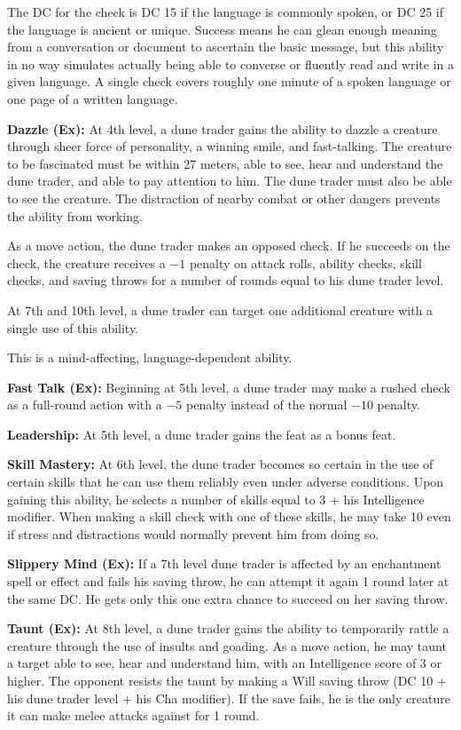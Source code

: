 {The DC for the check is DC 15 if the language is commonly spoken, or DC 25 if the language is ancient or unique. Success means he can glean enough meaning from a conversation or document to ascertain the basic message, but this ability in no way simulates actually being able to converse or fluently read and write in a given language. A single check covers roughly one minute of a spoken language or one page of a written language.

\textbf{Dazzle (Ex):} At 4th level, a dune trader gains the ability to dazzle a creature through sheer force of personality, a winning smile, and fast-talking. The creature to be fascinated must be within 27 meters, able to see, hear and understand the dune trader, and able to pay attention to him. The dune trader must also be able to see the creature. The distraction of nearby combat or other dangers prevents the ability from working.

As a move action, the dune trader makes an opposed  check. If he succeeds on the check, the creature receives a $-1$ penalty on attack rolls, ability checks, skill checks, and saving throws for a number of rounds equal to his dune trader level.

At 7th and 10th level, a dune trader can target one additional creature with a single use of this ability.

This is a mind-affecting, language-dependent ability.

\textbf{Fast Talk (Ex):} Beginning at 5th level, a dune trader may make a rushed  check as a full-round action with a $-5$ penalty instead of the normal $-10$ penalty.

\textbf{Leadership:} At 5th level, a dune trader gains the  feat as a bonus feat.

\textbf{Skill Mastery:} At 6th level, the dune trader becomes so certain in the use of certain skills that he can use them reliably even under adverse conditions. Upon gaining this ability, he selects a number of skills equal to 3 + his Intelligence modifier. When making a skill check with one of these skills, he may take 10 even if stress and distractions would normally prevent him from doing so.

\textbf{Slippery Mind (Ex):} If a 7th level dune trader is affected by an enchantment spell or effect and fails his saving throw, he can attempt it again 1 round later at the same DC. He gets only this one extra chance to succeed on her saving throw.

\textbf{Taunt (Ex):} At 8th level, a dune trader gains the ability to temporarily rattle a creature through the use of insults and goading. As a move action, he may taunt a target able to see, hear and understand him, with an Intelligence score of 3 or higher. The opponent resists the taunt by making a Will saving throw (DC 10 + his dune trader level + his Cha modifier). If the save fails, he is the only creature it can make melee attacks against for 1 round.

}
